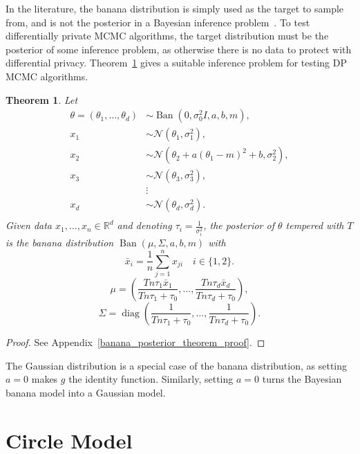 \documentclass[english,twoside,openright]{HYgraduMLDS}
\newtheorem{theorem}{Theorem}
\newcommand{\R}{\mathbb{R}}
\newcommand{\caln}{{\mathcal{N}}}
\DeclareMathOperator{\ban}{Ban}
\DeclareMathOperator{\diag}{diag}
\begin{document}
In the literature, the banana distribution is simply used as the target to
sample from, and is not the posterior in a Bayesian inference
problem~\cite{TPK14}. To test differentially private MCMC algorithms, the
target distribution must be the posterior of some inference problem, as
otherwise there is no data to protect with differential privacy.
Theorem~\ref{banana_posterior_theorem} gives a suitable inference problem
for testing DP MCMC algorithms.

\begin{theorem}\label{banana_posterior_theorem}
    Let
    \begin{align*}
        \theta = (\theta_1,\dotsc, \theta_d) &\sim
        \ban(0, \sigma_0^2I, a, b, m), \\
        x_1 &\sim \caln(\theta_1, \sigma_1^2), \\
        x_2 &\sim \caln(\theta_2 + a(\theta_1 - m)^2 + b, \sigma_2^2),\\
        x_3 &\sim \caln(\theta_3, \sigma_3^2), \\
            &\vdots \\
        x_d &\sim \caln(\theta_d, \sigma_d^2). \\
    \end{align*}
    Given data \(x_1,\dotsc, x_n\in \R^d\) and
    denoting \(\tau_i = \frac{1}{\sigma_i^2}\),
    the posterior of \(\theta\) tempered with \(T\) is the banana distribution
    \(\ban(\mu, \Sigma, a, b, m)\)
    with
    \[
        \bar{x}_i = \frac{1}{n}\sum_{j=1}^n x_{ji} \quad i\in \{1, 2\}.
    \]
    \[
        \mu = \left(\frac{Tn\tau_1\bar{x}_1}{Tn\tau_1 + \tau_0},\dotsc,
        \frac{Tn\tau_d\bar{x}_d}{Tn\tau_d + \tau_0}\right),
    \]
    \[
        \Sigma = \diag\left(
            \frac{1}{Tn\tau_1 + \tau_0},\dotsc,
            \frac{1}{Tn\tau_d + \tau_0}
        \right).
    \]
\end{theorem}
\begin{proof}
  See Appendix~\ref{banana_posterior_theorem_proof}.
\end{proof}
\setcounter{banana_posterior_theorem_number}{\value{theorem}}

The Gaussian distribution is a special case of the banana distribution,
as setting \(a = 0\) makes \(g\) the identity function. Similarly, setting
\(a = 0\) turns the Bayesian banana model into a Gaussian model.


\section{Circle Model}\label{circle_section}
\end{document}
